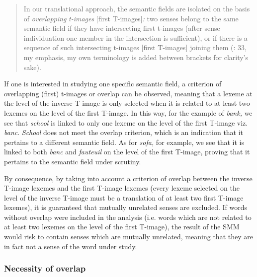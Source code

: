 \begin{quote}
In our translational approach, the semantic fields are isolated on the basis of \textit{overlapping} \textit{t-images}\textbf{ }[first T-images]\textit{:} two senses belong to the same semantic field if they have intersecting first t-images (after sense individuation one member in the intersection is sufficient), or if there is a sequence of such intersecting t-images [first T-images] joining them (\citealt{langemets_translations_2005}: 33, my emphasis, my own terminology is added between brackets for clarity’s sake).
\end{quote}


If one is interested in studying one specific semantic field, a criterion of overlapping (first) t-images or overlap can be observed, meaning that a lexeme at the level of the inverse T-image is only selected when it is related to at least two lexemes on the level of the first T-image. In this way, for the example of \textit{bank,} we see that \textit{school} is linked to only one lexeme on the level of the first T-image viz. \textit{banc}. \textit{School} does not meet the overlap criterion, which is an indication that it pertains to a different semantic field. As for \textit{sofa,} for example, we see that it is linked to both \textit{banc} and \textit{fauteuil} on the level of the first T-image, proving that it pertains to the semantic field under scrutiny.



By consequence, by taking into account a criterion of overlap between the inverse T-image lexemes and the first T-image lexemes (every lexeme selected on the level of the inverse T-image must be a translation of at least two first T-image lexemes), it is guaranteed that mutually unrelated senses are excluded. If words without overlap were included in the analysis (i.e. words which are not related to at least two lexemes on the level of the first T-image), the result of the SMM would risk to contain senses which are mutually unrelated, meaning that they are in fact not a sense of the word under study.


\subsubsection{\label{sec:3.4.3.5}  Necessity of overlap}

